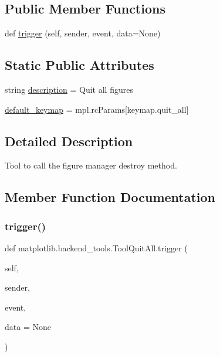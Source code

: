\subsection*{Public Member Functions}
\begin{DoxyCompactItemize}
\item 
def \hyperlink{classmatplotlib_1_1backend__tools_1_1ToolQuitAll_a49745ed15a33458a514636679c2b76f5}{trigger} (self, sender, event, data=None)
\end{DoxyCompactItemize}
\subsection*{Static Public Attributes}
\begin{DoxyCompactItemize}
\item 
string \hyperlink{classmatplotlib_1_1backend__tools_1_1ToolQuitAll_a7e1fa3c3f38e196d8927a26aeae60009}{description} = \textquotesingle{}Quit all figures\textquotesingle{}
\item 
\hyperlink{classmatplotlib_1_1backend__tools_1_1ToolQuitAll_aba61823e2e6717a85c2fbbda4364d512}{default\+\_\+keymap} = mpl.\+rc\+Params\mbox{[}\textquotesingle{}keymap.\+quit\+\_\+all\textquotesingle{}\mbox{]}
\end{DoxyCompactItemize}


\subsection{Detailed Description}
\begin{DoxyVerb}Tool to call the figure manager destroy method.\end{DoxyVerb}
 

\subsection{Member Function Documentation}
\mbox{\label{classmatplotlib_1_1backend__tools_1_1ToolQuitAll_a49745ed15a33458a514636679c2b76f5}} 
\subsubsection{\texorpdfstring{trigger()}{trigger()}}
{\footnotesize\ttfamily def matplotlib.\+backend\+\_\+tools.\+Tool\+Quit\+All.\+trigger (\begin{DoxyParamCaption}\item[{}]{self,  }\item[{}]{sender,  }\item[{}]{event,  }\item[{}]{data = {\ttfamily None} }\end{DoxyParamCaption})}



